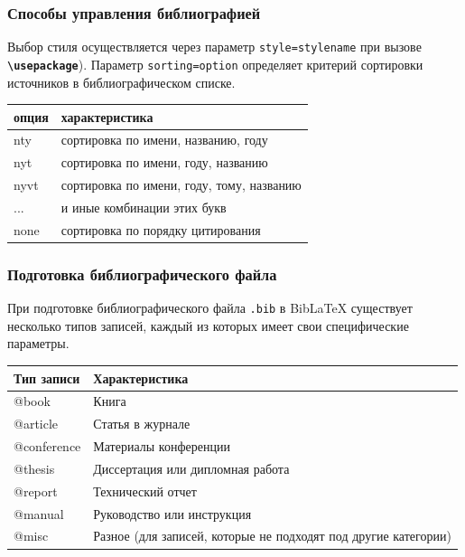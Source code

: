 \documentclass[aspectratio=169]{beamer}
\begin{document}
\begin{frame}
\frametitle{Способы управления библиографией}
Выбор стиля осуществляется через параметр \texttt{style=stylename} при вызове \texttt{\textbf{\textbackslash usepackage}}).
Параметр \texttt{sorting=option} определяет критерий сортировки источников в библиографическом списке.
\begin{table}[]
	\begin{tabular}{ll}
\textbf{опция} & \textbf{характеристика}                   \\ \hline
nty            & сортировка по имени, названию, году       \\
nyt            & сортировка по имени, году, названию       \\
nyvt           & сортировка по имени, году, тому, названию \\
...            & и иные комбинации этих букв               \\
none           & сортировка по порядку цитирования        
\end{tabular}
\end{table}
\end{frame}

\begin{frame}
\frametitle{Подготовка библиографического файла}
При подготовке библиографического файла \texttt{.bib} в BibLaTeX существует несколько типов записей, каждый из которых имеет свои специфические параметры.
\begin{table}[]
	\begin{tabular}{ll}
\textbf{Тип записи} & \textbf{Характеристика} \\ \hline
@book       & Книга \\
@article    & Статья в журнале \\
@conference & Материалы конференции \\
@thesis     & Диссертация или дипломная работа \\
@report     & Технический отчет \\
@manual     & Руководство или инструкция \\
@misc       & Разное (для записей, которые не подходят под другие категории)
\end{tabular}
\end{table}
\end{frame}
\end{document}
